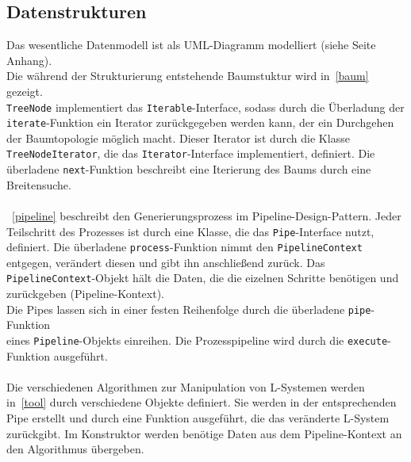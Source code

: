 \subsection*{Datenstrukturen}
Das wesentliche Datenmodell ist als UML-Diagramm modelliert (siehe Seite~\pageref{anhang} Anhang).\\
Die während der Strukturierung entstehende Baumstuktur wird in~\ref{baum} gezeigt.\\
\texttt{TreeNode} implementiert das \texttt{Iterable}-Interface, sodass durch die Überladung der \texttt{iterate}-Funktion
ein Iterator zurückgegeben werden kann, der ein Durchgehen der Baumtopologie möglich macht.
Dieser Iterator ist durch die Klasse \mbox{\texttt{TreeNodeIterator}}, die das \texttt{Iterator}-Interface implementiert, definiert.
Die überladene \texttt{next}-Funktion beschreibt eine Iterierung des Baums durch eine Breitensuche.\\~\\
~\ref{pipeline} beschreibt den Generierungsprozess im Pipeline-Design-Pattern.
Jeder Teilschritt des Prozesses ist durch eine Klasse, die das \texttt{Pipe}-Interface nutzt, definiert.
Die überladene \texttt{process}-Funktion nimmt den \texttt{PipelineContext} entgegen, verändert diesen und gibt ihn
anschließend zurück.
Das \texttt{PipelineContext}-Objekt hält die Daten, die die eizelnen Schritte benötigen und zurückgeben (Pipeline-Kontext).\\
Die Pipes lassen sich in einer festen Reihenfolge durch die überladene \texttt{pipe}-Funktion\\eines
\texttt{Pipeline}-Objekts einreihen.
Die Prozesspipeline wird durch die \texttt{execute}-Funktion ausgeführt.\\~\\
Die verschiedenen Algorithmen zur Manipulation von L-Systemen werden in~\ref{tool} durch verschiedene Objekte definiert.
Sie werden in der entsprechenden Pipe erstellt und durch eine Funktion ausgeführt, die das veränderte L-System
zurückgibt.
Im Konstruktor werden benötige Daten aus dem Pipeline-Kontext an den Algorithmus übergeben.